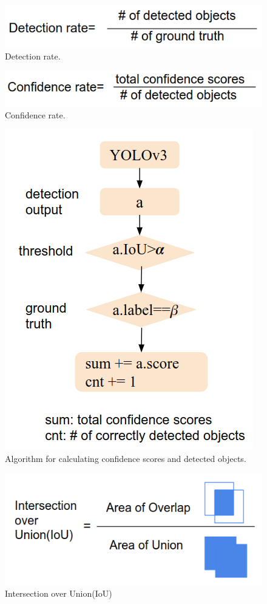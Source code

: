 \begin{figure}
	\centering
	\includegraphics[width=0.7\linewidth]{figure/detection.png}
	\caption{Detection rate.}
	\label{fig:detection}
\end{figure}

\begin{figure}
	\centering
	\includegraphics[width=0.7\linewidth]{figure/confidence.png}
	\caption{Confidence rate.}
	\label{fig:conf}
\end{figure}
%
\begin{figure}
	\centering
	\includegraphics[width=0.5\linewidth]{figure/algorithm.png}
	\caption{Algorithm for calculating confidence scores and detected objects.}
	\label{fig:algo}
\end{figure}

\begin{figure}
	\centering
	\includegraphics[width=0.5\linewidth]{figure/iou.png}
	\caption{Intersection over Union(IoU)}
	\label{fig:iou}
\end{figure}

